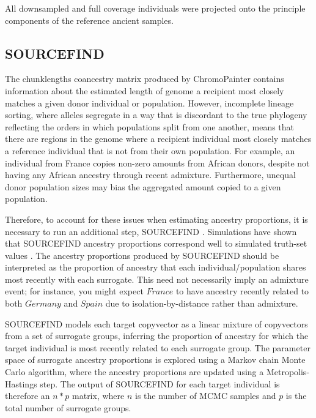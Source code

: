 {All downsampled and full coverage individuals were projected onto the principle components of the reference ancient samples. 


\subsection{SOURCEFIND}

The chunklengths coancestry matrix produced by ChromoPainter contains information about the estimated length of genome a recipient most closely matches a given donor individual or population. However, incomplete lineage sorting, where alleles segregate in a way that is discordant to the true phylogeny reflecting the orders in which populations split from one another, means that there are regions in the genome where a recipient individual most closely matches a reference individual that is not from their own population. For example, an individual from France copies non-zero amounts from African donors, despite not having any African ancestry through recent admixture. Furthermore, unequal donor population sizes may bias the aggregated amount copied to a given population. 

Therefore, to account for these issues when estimating ancestry proportions, it is necessary to run an additional step, SOURCEFIND \cite{Chacon-Duque2018}. Simulations have shown that SOURCEFIND ancestry proportions correspond well to simulated truth-set values \cite{Chacon-Duque2018}. The ancestry proportions produced by SOURCEFIND should be interpreted as the proportion of ancestry that each individual/population shares most recently with each surrogate. This need not necessarily imply an admixture event; for instance, you might expect $France$ to have ancestry recently related to both $Germany$ and $Spain$ due to isolation-by-distance rather than admixture. 

SOURCEFIND models each target copyvector as a linear mixture of copyvectors from a set of surrogate groups, inferring the proportion of ancestry for which the target individual is most recently related to each surrogate group. The parameter space of surrogate ancestry proportions is explored using a Markov chain Monte Carlo algorithm, where the ancestry proportions are updated using a Metropolis-Hastings step. The output of SOURCEFIND for each target individual is therefore an $n*p$ matrix, where $n$ is the number of MCMC samples and $p$ is the total number of surrogate groups. 

}
